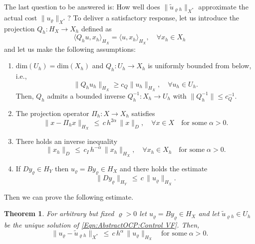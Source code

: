 \documentclass{article}
\newcommand{\norm}[1]{\|#1\|}
\newcommand{\skpr}[1]{\langle#1\rangle}
\newtheorem{theorem}{Theorem}
\numberwithin{equation}{section}
\begin{document}
\noindent
The last question to be answered is: How well does
$\norm{\widetilde{u}_{\varrho h}}_{X^\ast}$ approximate the actual cost
$\norm{u_\varrho}_{X^\ast}$? To deliver a satisfactory response, let us
introduce the projection $Q_h:H_{X}\to X_h$ defined as 
\begin{equation*}
  \skpr{Q_hu,x_h}_{H_X}= \skpr{u,x_h}_{H_X},\quad \forall x_h\in X_h 
\end{equation*} 
and let us make the following assumptions:
\begin{enumerate}
\item[{\em i.}] $\text{dim}(U_h) = \text{dim}(X_h)$ and
  $Q_h:U_h\to X_h$ is uniformly bounded from below, i.e., 
  \begin{equation*}
    \norm{Q_h u_h}_{H_X} \geq c_Q \norm{u_h}_{H_X},\quad \forall u_h\in U_h.
  \end{equation*}
  Then, $Q_h$ admits a bounded inverse $Q_h^{-1}:X_h\to U_h$ with
  $\norm{Q_h^{-1}}\leq c_Q^{-1}$.  
\item[{\em ii.}] The projection operator $\Pi_h:X\to X_h$ satisfies 
  \begin{equation*}
    \norm{x-\Pi_h x}_{H_X} \, \leq \,
    c \, h^{2\alpha} \, \norm{x}_D,\quad \forall x\in X
    \quad \mbox{for some} \; \alpha > 0.
  \end{equation*}
\item[{\em iii.}] There holds an inverse inequality 
  \begin{equation}\label{eq:AbstractOCP:inverse inequality}
    \norm{x_h}_D \, \leq \, c_I \, h^{-\alpha} \,
    \norm{x_h}_{H_X},\quad \forall x_h\in X_h \quad
    \mbox{for some} \; \alpha > 0 .
  \end{equation}
\item[{\em iv.}] If $Dy_\varrho\in H_Y$ then $u_\varrho = By_\varrho \in H_X$
  and there holds the estimate 
  \begin{equation}\label{Eqn:AbstractOCP:estimate_Dy-u}
    \norm{Dy_\varrho}_{H_Y} \, \leq \, c \, \norm{u_\varrho}_{H_X}. 
  \end{equation}
\end{enumerate}
Then we can prove the following estimate. 

\begin{theorem}
  For arbitrary but fixed $\varrho >0$ let $u_\varrho = By_\varrho\in H_X$
  and let $\widetilde{u}_{\varrho h}\in U_h$ be the unique solution of
  \eqref{Eqn:AbstractOCP:Control VF}. Then,
  \begin{equation*}
    \norm{u_\varrho  - \widetilde{u}_{\varrho h}}_{X^\ast} \, \leq \,
    c \, h^\alpha \, \norm{u_\varrho}_{H_X}
    \quad \mbox{for some} \; \alpha > 0.
  \end{equation*}
\end{theorem}
\end{document}

